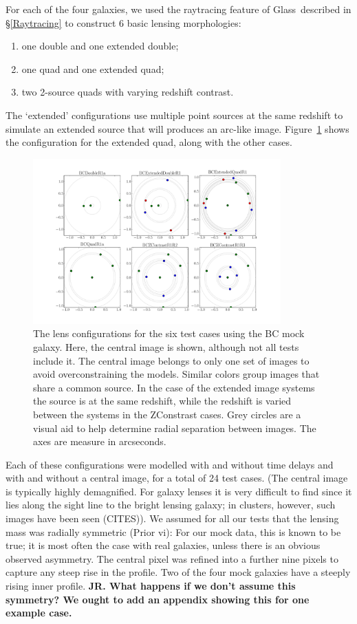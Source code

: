 \documentclass[galley,usenatbib]{mn2e}
\newcommand{\Glass}{{\sc Glass}}
\newcommand{\figref}[1] {Figure~\ref{#1}}
\newcommand{\secref}[1] {\S\ref{#1}}
\begin{document}
For each of the four galaxies, we used the raytracing feature of \Glass\
described in \secref{Raytracing} to construct 6 basic lensing morphologies:

\begin{enumerate}
\item one double and one extended double;
\item one quad and one extended quad;
\item two 2-source quads with varying redshift contrast.
\end{enumerate}
The `extended' configurations use multiple point sources at the same redshift
to simulate an extended source that will produces an arc-like image.
\figref{arrival surfaces} shows the configuration for the extended quad, along
with the other cases. 

\begin{figure}
\includegraphics[width=0.85\textwidth]{BCarrival_surfaces}
\caption{The lens configurations for the six test cases using the BC mock galaxy. Here,
the central image is shown, although not all tests include it. The central image belongs
to only one set of images to avoid overconstraining the models. Similar colors group
images that share a common source. In the case of the extended image systems the source
is at the same redshift, while the redshift is varied between the systems in the 
ZConstrast cases. Grey circles are a visual aid to help determine radial separation
between images. The axes are measure in arcseconds.}
\label{arrival surfaces}
\end{figure}

Each of these configurations were modelled with and without time delays and
with and without a central image, for a total of 24 test cases. (The central
image is typically highly demagnified. For galaxy lenses it is very difficult
to find since it lies along the sight line to the bright lensing galaxy; in
clusters, however, such images have been seen (CITES)). We assumed for all our
tests that the lensing mass was radially symmetric (Prior vi):
For our mock data, this is known to be
true; it is most often the case with real galaxies, unless there is an obvious
observed asymmetry. The central pixel was refined into a further nine pixels to
capture any steep rise in the profile.  Two of the four mock galaxies have a
steeply rising inner profile. {\bf JR.  What happens if we don't assume this
symmetry? We ought to add an appendix showing this for one example case.}
\end{document}
